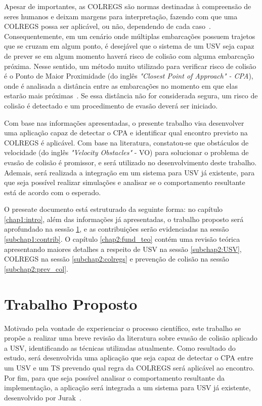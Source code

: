     Apesar de importantes, as COLREGS são normas destinadas à compreensão de seres humanos e deixam margens para interpretação, fazendo com que uma COLREGS possa ser aplicável, ou não, dependendo de cada caso~\cite{KUWATA2014110}. Consequentemente, em um cenário onde múltiplas embarcações possuem trajetos que se cruzam em algum ponto, é desejável que o sistema de um USV seja capaz de prever se em algum momento haverá risco de colisão com alguma embarcação próxima. Nesse sentido, um método muito utilizado para verificar risco de colisão é o Ponto de Maior Proximidade (do inglês \textit{"Closest Point of Approach" - CPA}), onde é analisada a distância entre as embarcações no momento em que elas estarão mais próximas~\cite{HUANG2019142}. Se essa distância não for considerada segura, um risco de colisão é detectado e um procedimento de evasão deverá ser iniciado.
    
    Com base nas informações apresentadas, o presente trabalho visa desenvolver uma aplicação capaz de detectar o CPA e identificar qual encontro previsto na COLREGS é aplicável. Com base na literatura, constatou-se que obstáculos de velocidade (do inglês \textit{"Velocity Obstacles"} - VO) para solucionar o problema de evasão de colisão é promissor, e será utilizado no desenvolvimento deste trabalho. Ademais, será realizada a integração em um sistema para USV já existente, para que seja possível realizar simulações e analisar se o comportamento resultante está de acordo com o esperado. 
    
    O preseate documento está estruturado da seguinte forma: no capítulo \ref{chap1:intro}, além das informações já apresentadas, o trabalho proposto será aprofundado na sessão \ref{subchap1:trab_prop}, e as contribuições serão evidenciadas na sessão \ref{subchap1:contrib}. O capítulo \ref{chap2:fund_teo} contém uma revisão teórica apresentando maiores detalhes a respeito de USV na sessão \ref{subchap2:USV}, COLREGS na sessão \ref{subchap2:colregs} e prevenção de colisão na sessão \ref{subchap2:prev_col}.
    
    \section{Trabalho Proposto}\label{subchap1:trab_prop}
        Motivado pela vontade de experienciar o processo científico, este trabalho se propõe a realizar uma breve revisão da literatura sobre evasão de colisão aplicado a USV, identificando as técnicas utilizadas atualmente. Como resultado do estudo, será desenvolvida uma aplicação que seja capaz de detectar o CPA entre um USV e um TS prevendo qual regra da COLREGS será aplicável ao encontro. Por fim, para que seja possível analisar o comportamento resultante da implementação, a aplicação será integrada a um sistema para USV já existente, desenvolvido por Jurak~\cite{JURAK2020}.
        
